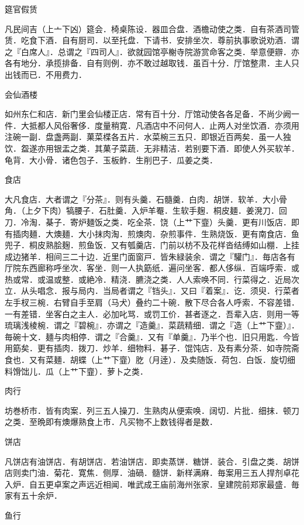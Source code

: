 \documentclass[]{article}
\begin{document}
筵官假赁

凡民间吉（上亠下凶）筵会．椅桌陈设．器皿合盘．酒檐动使之类．自有茶酒司管赁．吃食下酒．自有厨司．以至托盘．下请书．安排坐次．尊前执事歌说劝酒．谓之『白席人』．总谓之『四司人』．欲就园馆亭榭寺院游赏命客之类．举意便辧．亦各有地分．承揽排备．自有则例．亦不敢过越取钱．虽百十分．厅馆整肃．主人只出钱而已．不用费力．

会仙酒楼

如州东仁和店．新门里会仙楼正店．常有百十分．厅馆动使各各足备．不尚少阙一件．大抵都人风俗奢侈．度量稍寛．凡酒店中不问何人．止两人对坐饮酒．亦须用注碗一副．盘盏两副．菓菜楪各五片．水菜椀三五只．即银近百两矣．虽一人独饮．盌遂亦用银盂之类．其菓子菜蔬．无非精洁．若别要下酒．即使人外买软羊．龟背．大小骨．诸色包子．玉板鲊．生削巴子．瓜姜之类．

食店

大凡食店．大者谓之『分茶』．则有头羹．石髓羹．白肉．胡饼．软羊．大小骨角．（上夕下肉）犒腰子．石肚羹．入炉羊罨．生软手麹．桐皮麺．姜溌刀．回刀．冷淘．棊子．寄炉麺饭之类．吃全茶．饶（上艹下韲）头羹．更有川饭店．即有插肉麺．大燠麺．大小抹肉淘．煎燠肉．杂煎事件．生熟烧饭．更有南食店．鱼兜子．桐皮熟脍麹．煎鱼饭．又有瓠羹店．门前以枋不及花样沓结缚如山棚．上挂成边猪羊．相间三二十边．近里门面窗戸．皆朱緑装余．谓之『驩门』．毎店各有厅院东西廊称呼坐次．客坐．则一人执筯纸．遍问坐客．都人侈纵．百端呼索．或热或常．或温或整．或絶冷．精浇．臕浇之类．人人索唤不同．行菜得之．近局次立．从头唱念．报与局内．当局者谓之『铛头』．又曰『着案』．讫．须臾．行菜者左手杈三椀．右臂自手至肩（马犬）叠约二十碗．散下尽合各人呼索．不容差错．一有差错．坐客白之主人．必加叱骂．或罚工价．甚者逐之．吾辈入店．则用一等琉璃浅棱椀．谓之『碧椀』．亦谓之『造羹』．菜蔬精细．谓之『造（上艹下韲）』．毎碗十文．麺与肉相停．谓之『合羹』．又有『单羹』．乃半个也．旧只用匙．今皆用筯矣．更有插肉．拨刀．炒羊．细物料．碁子．馄饨店．及有素分茶．如寺院斋食也．又有菜麺．胡蝶（上艹下韲）肐（月逹）．及卖随饭．荷包．白饭．旋切细料馉饳儿．瓜（上艹下韲）．萝卜之类．

肉行

坊巻桥市．皆有肉案．列三五人操刀．生熟肉从便索唤．阔切．片批．细抹．顿刀之类．至晩即有燠爆熟食上市．凡买物不上数钱得者是数．

饼店

凡饼店有油饼店．有胡饼店．若油饼店．即卖蒸饼．糖饼．装合．引盘之类．胡饼店则卖门油．菊花．寛焦．侧厚．油碢．髓饼．新样满麻．毎案用三五人捍剂卓花入炉．自五更卓案之声远近相闻．唯武成王庙前海州张家．皇建院前郑家最盛．毎家有五十余炉．

鱼行
\end{document}
